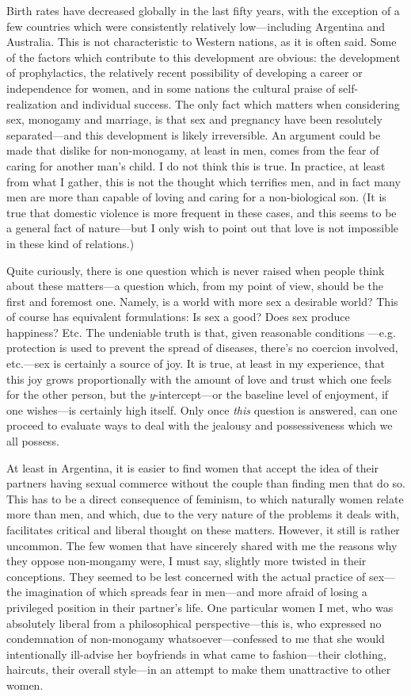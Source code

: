 \documentclass[a4paper, 12pt]{article}
\begin{document}
Birth rates have decreased globally in the last fifty years, with the exception
of a few countries which were consistently relatively low---including Argentina
and Australia. This is not characteristic to Western nations, as it is often
said. Some of the factors which contribute to this development are obvious: the
development of prophylactics, the relatively recent possibility of developing a
career or independence for women, and in some nations the cultural praise of
self-realization and individual success. The only fact which matters when
considering sex, monogamy and marriage, is that sex and pregnancy have been
resolutely separated---and this development is likely irreversible. An argument
could be made that dislike for non-monogamy, at least in men, comes from the fear 
of caring for another man's child. I do not think this is true. In practice, at
least from what I gather, this is not the thought which terrifies men, and in
fact many men are more than capable of loving and caring for a non-biological
son. (It is true that domestic violence is more frequent in these cases,
and this seems to be a general fact of nature---but I only wish to point out
that love is not impossible in these kind of relations.)

Quite curiously, there is one question which is never raised when people think
about these matters---a question which, from my point of view, should be the
first and foremost one. Namely, is a world with more sex a desirable world?
This of course has equivalent formulations: Is sex a good? Does sex produce
happiness? Etc. The undeniable truth is that, given reasonable conditions
---e.g. protection is used to prevent the spread of diseases, there's no
coercion involved, etc.---sex is certainly a source of joy. It is true, at
least in my experience, that this joy grows proportionally with the amount of
love and trust which one feels for the other person, but the $y$-intercept---or
the baseline level of enjoyment, if one wishes---is certainly high itself.
Only once \textit{this} question is answered, can one proceed to evaluate 
ways to deal with the jealousy and possessiveness which we all possess.

At least in Argentina, it is easier to find women that accept the idea of their
partners having sexual commerce without the couple than finding men that do so.
This has to be a direct consequence of feminism, to which naturally women
relate more than men, and which, due to the very nature of the problems it
deals with, facilitates critical and liberal thought on these matters. However,
it still is rather uncommon. The few women that have sincerely shared with me
the reasons why they oppose non-mongamy were, I must say, slightly more twisted
in their conceptions. They seemed to be lest concerned with the actual practice
of sex---the imagination of which spreads fear in men---and more afraid of
losing a privileged position in their partner's life. One particular women I
met, who was absolutely liberal from a philosophical perspective---this is, who
expressed no condemnation of non-monogamy whatsoever---confessed to me that she
would intentionally ill-advise her boyfriends in what came to fashion---their
clothing, haircuts, their overall style---in an attempt to make them
unattractive to other women.
\end{document}
